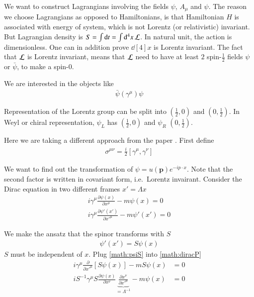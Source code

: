 
We want to construct Lagrangians involving the fields $\psi$, $A_\mu$ and $\psi$. The reason we choose Lagrangians as opposed to Hamiltonians, is that Hamiltonian $H$ is associated with energy of system, which is not Lorentz (or relativistic) invariant. But Lagrangian density is $S = \int \dd{t} = \int \dd[4]{x} \mathcal{L}$. In natural unit, the action is dimensionless. One can in addition prove $\dd[4]{x}$ is Lorentz invariant.  The fact that $\mathcal{L}$ is Lorentz invariant, means that $\mathcal{L}$ need to have at least $2$ spin-$\frac{1}{2}$ fields $\psi$ or $\bar{\psi}$, to make a spin-$0$.

We are interested in the objects like
\begin{align*}
   \bar{\psi}(\gamma^\mu) \psi
\end{align*}

Representation of the Lorentz group can be split into $ \left( \frac{1}{2}, 0 \right)$ and $ \left( 0, \frac{1}{2} \right)$. In Weyl or chiral representation, $\psi_L$ has $ \left( \frac{1}{2}, 0 \right)$ and $\psi_R$ $ \left( 0, \frac{1}{2} \right)$.

Here we are taking a different approach from the paper \cite{Dreiner_2010}. First define
\begin{align}
   \sigma^{\mu\nu} = \frac{i}{2} \left[ \gamma^\mu, \gamma^\nu \right]
\end{align}

We want to find out the transformation of $\psi = u(\pmb{p})e^{-ip\cdot x}$. Note that the second factor is written in covariant form, i.e.~Lorentz invairant. Consider the Dirac equation in two different frames $x' = \Lambda x$
\begin{align}
   i \gamma^\mu \frac{\partial \psi(x)}{\partial x^\mu} - m \psi(x) = 0 \label{math:dirac}\\
   i \gamma^\mu \frac{\partial \psi'(x')}{\partial x'^\mu} - m \psi'(x') = 0 \label{math:diracP}
\end{align}

We make the ansatz that the spinor transforms with $S$ 
\begin{align}
   \psi'(x') = S\psi(x) \label{math:psiS}
\end{align}
$S$ must be independent of $x$. Plug \ref{math:psiS} into \ref{math:diracP} 
\begin{align*}
   i \gamma^\mu \frac{\partial}{\partial x'^\mu} \left[ S \psi(x) \right] - m S \psi(x) &= 0 \\
   i S^{-1} \gamma^\mu S \frac{\partial \psi (x)}{\partial x^\nu} \underbrace{\frac{\partial x^\nu}{\partial x'^\mu}}_{=\Lambda^{-1}} - m\psi(x)  &= 0
\end{align*}

